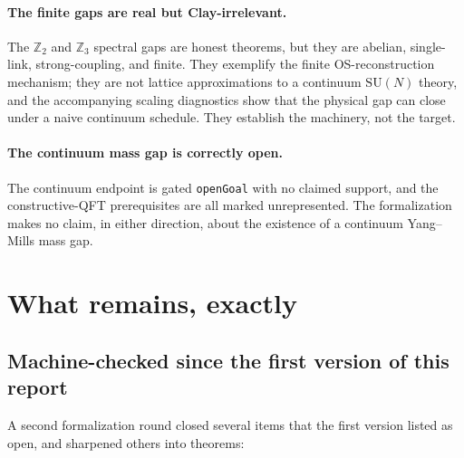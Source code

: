 \documentclass[11pt]{article}
\theoremstyle{definition}
\newcommand{\SUN}{\mathrm{SU}(N)}
\begin{document}
\paragraph{The finite gaps are real but Clay-irrelevant.}
The $\mathbb{Z}_2$ and $\mathbb{Z}_3$ spectral gaps are honest theorems, but
they are abelian, single-link, strong-coupling, and finite. They exemplify the
finite OS-reconstruction mechanism; they are not lattice approximations to a
continuum $\SUN$ theory, and the accompanying scaling diagnostics show that the
physical gap can close under a naive continuum schedule. They establish the
machinery, not the target.

\paragraph{The continuum mass gap is correctly open.}
The continuum endpoint is gated \texttt{openGoal} with no claimed support, and
the constructive-QFT prerequisites are all marked unrepresented. The
formalization makes no claim, in either direction, about the existence of a
continuum Yang--Mills mass gap.

\section{What remains, exactly}\label{sec:remains}

\subsection*{Machine-checked since the first version of this report}

A second formalization round closed several items that the first version listed
as open, and sharpened others into theorems:
\end{document}
